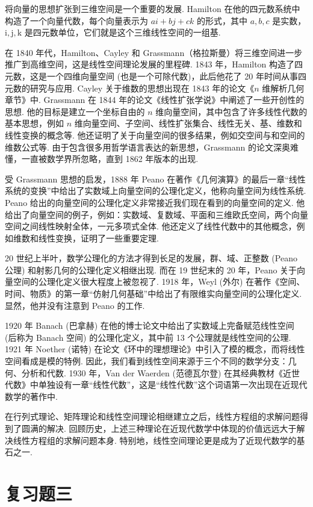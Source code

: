 \documentclass[UTF8,12pt,a4paper,fontset=fandol]{ctexart}
\begin{document}
将向量的思想扩张到三维空间是一个重要的发展. Hamilton 在他的四元数系统中构造了一个向量代数，每个向量表示为 $ai+bj+ck$ 的形式，其中 $a,b,c$ 是实数，$\mathrm{i},\mathrm{j},\mathrm{k}$ 是四元数单位，它们就是这个三维线性空间的一组基.

在 1840 年代，Hamilton、Cayley 和 Grassmann（格拉斯曼）将三维空间进一步推广到高维空间，这是线性空间理论发展的里程碑. 1843 年，Hamilton 构造了四元数，这是一个四维向量空间 (也是一个可除代数)，此后他花了 20 年时间从事四元数的研究与应用. Cayley 关于维数的思想出现在 1843 年的论文《$n$ 维解析几何章节》中. Grassmann 在 1844 年的论文《线性扩张学说》中阐述了一些开创性的思想. 他的目标是建立一个坐标自由的 $n$ 维向量空间，其中包含了许多线性代数的基本思想，例如 $n$ 维向量空间、子空间、线性扩张集合、线性无关、基、维数和线性变换的概念等. 他还证明了关于向量空间的很多结果，例如交空间与和空间的维数公式等. 由于包含很多用哲学语言表达的新思想，Grassmann 的论文深奥难懂，一直被数学界所忽略，直到 1862 年版本的出现.

受 Grassmann 思想的启发，1888 年 Peano 在著作《几何演算》的最后一章“线性系统的变换”中给出了实数域上向量空间的公理化定义，他称向量空间为线性系统. Peano 给出的向量空间的公理化定义非常接近我们现在看到的向量空间的定义. 他给出了向量空间的例子，例如：实数域、复数域、平面和三维欧氏空间，两个向量空间之间线性映射全体，一元多项式全体. 他还定义了线性代数中的其他概念，例如维数和线性变换，证明了一些重要定理.

20 世纪上半叶，数学公理化的方法才得到长足的发展，群、域、正整数 (Peano 公理) 和射影几何的公理化定义相继出现. 而在 19 世纪末的 20 年，Peano 关于向量空间的公理化定义很大程度上被忽视了. 1918 年，Weyl (外尔) 在著作《空间、时间、物质》的第一章“仿射几何基础”中给出了有限维实向量空间的公理化定义. 显然，他并没有注意到 Peano 的工作.

1920 年 Banach (巴拿赫) 在他的博士论文中给出了实数域上完备赋范线性空间 (后称为 Banach 空间) 的公理化定义，其中前 13 个公理就是线性空间的公理. 1921 年 Noether (诺特) 在论文《环中的理想理论》中引入了模的概念，而将线性空间看成是模的特例. 因此，我们看到线性空间来源于三个不同的数学分支：几何、分析和代数. 1930 年，Van der Waerden (范德瓦尔登) 在其经典教材《近世代数》中单独设有一章“线性代数”，这是“线性代数”这个词语第一次出现在近现代数学的著作中.

在行列式理论、矩阵理论和线性空间理论相继建立之后，线性方程组的求解问题得到了圆满的解决. 回顾历史，上述三种理论在近现代数学中体现的价值远远大于解决线性方程组的求解问题本身. 特别地，线性空间理论更是成为了近现代数学的基石之一.

\section*{复习题三}
\end{document}
